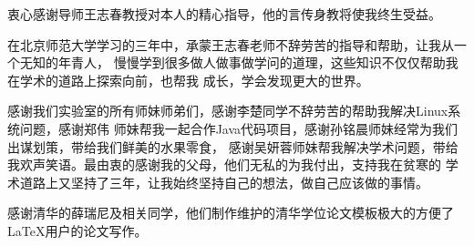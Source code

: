 
\begin{ack}
  衷心感谢导师王志春教授对本人的精心指导，他的言传身教将使我终生受益。

  在北京师范大学学习的三年中，承蒙王志春老师不辞劳苦的指导和帮助，让我从一个无知的年青人，
  慢慢学到很多做人做事做学问的道理，这些知识不仅仅帮助我在学术的道路上探索向前，也帮我
  成长，学会发现更大的世界。

  感谢我们实验室的所有师妹师弟们，感谢李楚同学不辞劳苦的帮助我解决Linux系统问题，感谢郑伟
  师妹帮我一起合作Java代码项目，感谢孙铭晨师妹经常为我们出谋划策，带给我们鲜美的水果零食，
  感谢吴妍蓉师妹帮我解决学术问题，带给我欢声笑语。最由衷的感谢我的父母，他们无私的为我付出，支持我在贫寒的
  学术道路上又坚持了三年，让我始终坚持自己的想法，做自己应该做的事情。

  感谢清华的薛瑞尼及相关同学，他们制作维护的清华学位论文模板极大的方便了\LaTeX{}用户的论文写作。


\end{ack}
